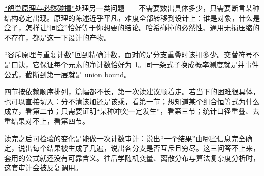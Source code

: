 \hyperref[sec:04-Discrete-Mathematics/01-Combinatorics/03]{``鸽巢原理与必然碰撞''}处理另一类问题——不需要数出具体多少，只需要断言某种结构必定出现。原理的陈述近乎平凡，难度全部转移到设计上：谁是对象，什么是盒子，怎样让``同盒''恰好等于你想要的结论。哈希碰撞的必然性、通用无损压缩的不存在，都是这一下设计的产物。

\hyperref[sec:04-Discrete-Mathematics/01-Combinatorics/04]{``容斥原理与重复计数''}回到精确计数，面对的是分支重叠时该扣多少。交替符号不是口诀，它保证每个元素的净计数恰好为 1。同一条式子换成概率测度就是并事件公式，截断到第一层就是 union bound。

四节按依赖顺序排列，篇幅都不长，第一次读建议顺着走。若当下的困难很具体，也可以直接切入：分不清该加还是该乘，看第一节；想知道某个组合恒等式为什么成立，看第二节；只需要证明``某种冲突一定发生''，看第三节；统计口径重叠、去重结果对不上，看第四节。

读完之后可检验的变化是能做一次计数审计：说出``一个结果''由哪些信息完全确定，说出每个结果被生成了几遍，说出各分支是否互斥且穷尽。这三问答不上来，套用的公式就还没有可靠含义。往后学随机变量、离散分布与算法复杂度分析时，这套审计会被反复调用。

